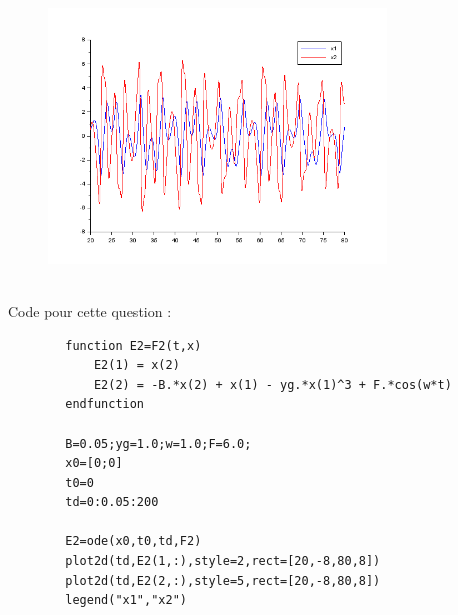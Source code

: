 \documentclass[11pt]{article}
\begin{document}
    \begin{figure}[H]
        \centering
        \includegraphics[width=0.8\textwidth,height=0.5\textwidth]{E2_3}
    \end{figure}
    ~\\
    Code pour cette question :
    \begin{verbatim}
        function E2=F2(t,x)
            E2(1) = x(2)
            E2(2) = -B.*x(2) + x(1) - yg.*x(1)^3 + F.*cos(w*t)
        endfunction

        B=0.05;yg=1.0;w=1.0;F=6.0;
        x0=[0;0]
        t0=0
        td=0:0.05:200

        E2=ode(x0,t0,td,F2)
        plot2d(td,E2(1,:),style=2,rect=[20,-8,80,8])
        plot2d(td,E2(2,:),style=5,rect=[20,-8,80,8])
        legend("x1","x2")
    \end{verbatim}
\end{document}
